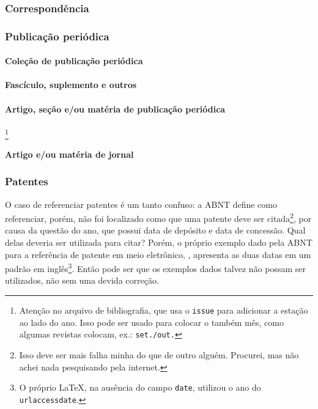 

\subsubsection{Correspondência}

\subsubsection{Publicação periódica}
\paragraph{Coleção de publicação periódica}


\paragraph{Fascículo, suplemento e outros}


\paragraph{Artigo, seção e/ou matéria de publicação periódica}
\footnote{Atenção no arquivo de bibliografia, que usa o \texttt{issue} para adicionar a estação ao lado do ano. Isso pode ser usado para colocar o também mês, como algumas revistas colocam, ex.: \texttt{set./out.}}



\paragraph{Artigo e/ou matéria de jornal}


\subsubsection{Patentes}
O caso de referenciar patentes é um tanto confuso: a ABNT define como referenciar, porém, não foi localizado como que uma patente deve ser citada\footnote{Isso deve ser mais falha minha do que de outro alguém. Procurei, mas não achei nada pesquisando pela internet.}, por causa da questão do ano, que possui data de depósito e data de concessão. Qual delas deveria ser utilizada para citar? Porém, o próprio exemplo dado pela ABNT para a referência de patente em meio eletrônico, \cite{patente:eletronico}, apresenta as duas datas em um padrão em inglês\footnote{O próprio \LaTeX, na ausência do campo \texttt{date}, utilizou o ano do \texttt{urlaccessdate}.}. Então pode ser que os exemplos dados talvez não possam ser utilizados, não sem uma devida correção.

